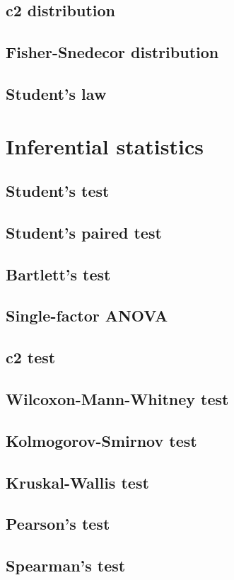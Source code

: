 \documentclass{report}
\begin{document}
	\section{c2 distribution}
	\section{Fisher-Snedecor distribution}
	\section{Student’s law}

\chapter{Inferential statistics}
	\section{Student’s test}
	\section{Student’s paired test}
	\section{Bartlett’s test}
	\section{Single-factor ANOVA}
	\section{c2 test}
	\section{Wilcoxon-Mann-Whitney test}
	\section{Kolmogorov-Smirnov test}
	\section{Kruskal-Wallis test}
	\section{Pearson’s test}
	\section{Spearman’s test}
\end{document}
